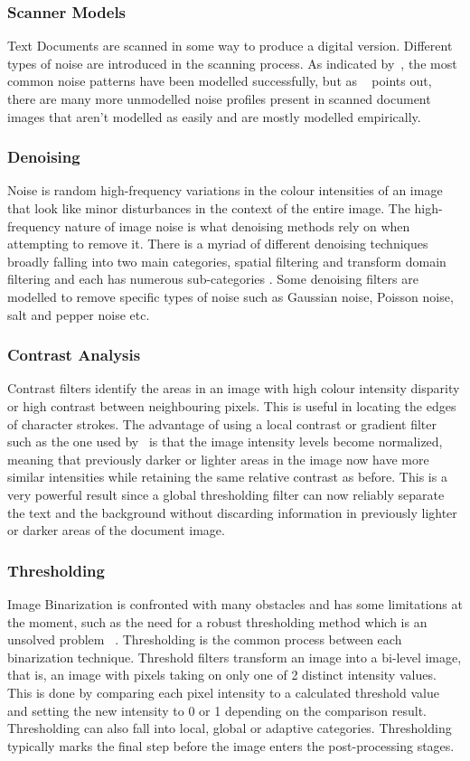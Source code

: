 \documentclass[a4paper, 12pt]{report}
\begin{document}
\subsubsection{Scanner Models}
Text Documents are scanned in some way to produce a digital version. Different
types of noise are introduced in the scanning process. As indicated
by~\cite{smoaca2011id}, the most common noise patterns have been modelled
successfully, but as ~\cite{eskenazi2016stability} points out, there are many
more unmodelled noise profiles present in scanned document images that aren’t
modelled as easily and are mostly modelled empirically.

\subsubsection{Denoising}
Noise is random high-frequency variations in the colour intensities of an image
that look like minor disturbances in the context of the entire image. The
high-frequency nature of image noise is what denoising methods rely on when
attempting to remove it. There is a myriad of different denoising techniques
broadly falling into two main categories, spatial filtering and transform
domain filtering and each has numerous sub-categories \cite{motwani2004survey}.
Some denoising filters are modelled to remove specific types of noise such as
Gaussian noise, Poisson noise, salt and pepper noise etc.

\subsubsection{Contrast Analysis}
Contrast filters identify the areas in an image with high colour intensity
disparity or high contrast between neighbouring pixels. This is useful in
locating the edges of character strokes. The advantage of using a local
contrast or gradient filter such as the one used by~\cite{su2012robust} is that
the image intensity levels become normalized, meaning that previously darker or
lighter areas in the image now have more similar intensities while retaining
the same relative contrast as before. This is a very powerful result since a
global thresholding filter can now reliably separate the text and the
background without discarding information in previously lighter or darker areas
of the document image.

\subsubsection{Thresholding}
Image Binarization is confronted with many obstacles and has some limitations
at the moment, such as the need for a robust thresholding method which is an
unsolved problem ~\cite{su2012robust}. Thresholding is the common process
between each binarization technique. Threshold filters transform an image into
a bi-level image, that is, an image with pixels taking on only one of 2
distinct intensity values. This is done by comparing each pixel intensity to a
calculated threshold value and setting the new intensity to 0 or 1 depending on
the comparison result. Thresholding can also fall into local, global or
adaptive categories. Thresholding typically marks the final step before the
image enters the post-processing stages.
\end{document}
